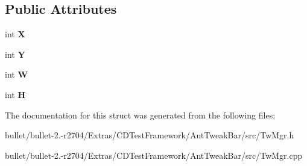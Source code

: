 \subsection*{Public Attributes}
\begin{DoxyCompactItemize}
\item 
\hypertarget{struct_c_rect_ac4eb480aae41c1dc3fdf6891a78697f3}{int {\bfseries X}}\label{struct_c_rect_ac4eb480aae41c1dc3fdf6891a78697f3}

\item 
\hypertarget{struct_c_rect_a70d94917988eea4fc08b875b3cb3dd1e}{int {\bfseries Y}}\label{struct_c_rect_a70d94917988eea4fc08b875b3cb3dd1e}

\item 
\hypertarget{struct_c_rect_a9b355072c09de3e988abb424d3eac20f}{int {\bfseries W}}\label{struct_c_rect_a9b355072c09de3e988abb424d3eac20f}

\item 
\hypertarget{struct_c_rect_a37099a6aeff2630c80b68c65a204aa3c}{int {\bfseries H}}\label{struct_c_rect_a37099a6aeff2630c80b68c65a204aa3c}

\end{DoxyCompactItemize}


The documentation for this struct was generated from the following files\+:\begin{DoxyCompactItemize}
\item 
bullet/bullet-\/2.-\/r2704/\+Extras/\+C\+D\+Test\+Framework/\+Ant\+Tweak\+Bar/src/Tw\+Mgr.\+h\item 
bullet/bullet-\/2.-\/r2704/\+Extras/\+C\+D\+Test\+Framework/\+Ant\+Tweak\+Bar/src/Tw\+Mgr.\+cpp\end{DoxyCompactItemize}
